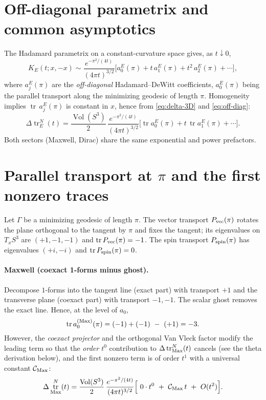 \documentclass[11pt]{article}
\theoremstyle{definition}
\theoremstyle{remark}
\DeclareMathOperator{\tr}{tr}
\DeclareMathOperator{\Vol}{Vol}
\begin{document}
\section{Off-diagonal parametrix and common asymptotics}
The Hadamard parametrix on a constant-curvature space gives, as $t\downarrow 0$,
\begin{equation}\label{eq:off-diag}
K_E(t;x,-x)\sim \frac{e^{-\pi^2/(4t)}}{(4\pi t)^{3/2}}\Big[a_0^{E}(\pi)+t\,a_1^{E}(\pi)+t^2\,a_2^{E}(\pi)+\cdots\Big],
\end{equation}
where $a_j^E(\pi)$ are the \emph{off-diagonal} Hadamard--DeWitt coefficients, $a_0^E(\pi)$ being the parallel transport along the minimizing geodesic of length $\pi$. Homogeneity implies $\tr\,a_j^E(\pi)$ is constant in $x$, hence from \eqref{eq:delta-3D} and \eqref{eq:off-diag}:
\begin{equation}\label{eq:delta-3D-asymp}
\Delta \tr^{N}_E(t)
=\frac{\Vol(S^3)}{2}\,\frac{e^{-\pi^2/(4t)}}{(4\pi t)^{3/2}}\big[\tr a_0^E(\pi)+t\,\tr a_1^E(\pi)+\cdots\big].
\end{equation}
Both sectors (Maxwell, Dirac) share the same exponential and power prefactors.

\section{Parallel transport at $\pi$ and the first nonzero traces}
Let $\Gamma$ be a minimizing geodesic of length $\pi$. The vector transport $P_{\rm vec}(\pi)$ rotates the plane orthogonal to the tangent by $\pi$ and fixes the tangent; its eigenvalues on $T_xS^3$ are $(+1,-1,-1)$ and $\tr P_{\rm vec}(\pi)=-1$. The spin transport $P_{\rm spin}(\pi)$ has eigenvalues $(+i,-i)$ and $\tr P_{\rm spin}(\pi)=0$.

\paragraph{Maxwell (coexact 1-forms minus ghost).}
Decompose $1$-forms into the tangent line (exact part) with transport $+1$ and the transverse plane (coexact part) with transport $-1,-1$. The scalar ghost removes the exact line. Hence, at the level of $a_0$,
\[
\tr a_0^{\rm(Max)}(\pi)=(-1)+(-1)\ -\ (+1)= -3.
\]
However, the \emph{coexact projector} and the orthogonal Van Vleck factor modify the leading term so that the \emph{order $t^0$} contribution to $\Delta \tr^{N}_{\rm Max}(t)$ cancels (see the theta derivation below), and the first nonzero term is of order $t^1$ with a universal constant $\mathcal{C}_{\rm Max}$:
\begin{equation}\label{eq:Max-expansion}
\Delta \tr^{N}_{\rm Max}(t)
=\frac{\Vol(S^3)}{2}\,\frac{e^{-\pi^2/(4t)}}{(4\pi t)^{3/2}}\Big[\ 0\cdot t^0\ +\ \mathcal{C}_{\rm Max}\,t\ +\ O(t^2)\Big].
\end{equation}
\end{document}
